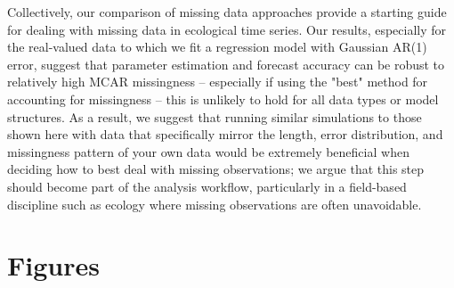 \documentclass{article}
\begin{document}
Collectively, our comparison of missing data approaches provide a starting guide for dealing with missing data in ecological time series. Our results, especially for the real-valued data to which we fit a regression model with Gaussian AR(1) error, suggest that parameter estimation and forecast accuracy can be robust to relatively high MCAR missingness -- especially if using the "best" method for accounting for missingness -- this is unlikely to hold for all data types or model structures. %
As a result, we suggest that running similar simulations to those shown here with data that specifically mirror the length, error distribution, and missingness pattern of your own data would be extremely beneficial when deciding how to best deal with missing observations; we argue that this step should become part of the analysis workflow, particularly in a field-based discipline such as ecology where missing observations are often unavoidable. %




\newpage


\section*{Figures}

\end{document}
